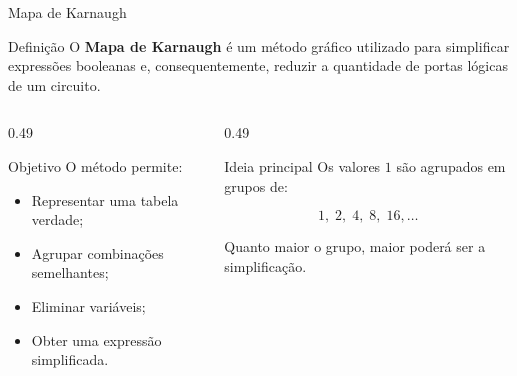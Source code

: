
\begin{frame}{Mapa de Karnaugh}
    \small

    \begin{block}{Definição}
        O \textbf{Mapa de Karnaugh} é um método gráfico utilizado para
        simplificar expressões booleanas e, consequentemente,
        reduzir a quantidade de portas lógicas de um circuito.
    \end{block}

    \begin{columns}[T]

        \begin{column}{0.49\textwidth}
            \begin{block}{Objetivo}
                O método permite:

                \begin{itemize}
                    \item Representar uma tabela verdade;
                    \item Agrupar combinações semelhantes;
                    \item Eliminar variáveis;
                    \item Obter uma expressão simplificada.
                \end{itemize}
            \end{block}
        \end{column}

        \begin{column}{0.49\textwidth}
            \begin{block}{Ideia principal}
                Os valores $1$ são agrupados em grupos de:

                \[
                    \boxed{1,\;2,\;4,\;8,\;16,\ldots}
                \]

                Quanto maior o grupo, maior poderá ser a
                simplificação.
            \end{block}
        \end{column}

    \end{columns}

\end{frame}